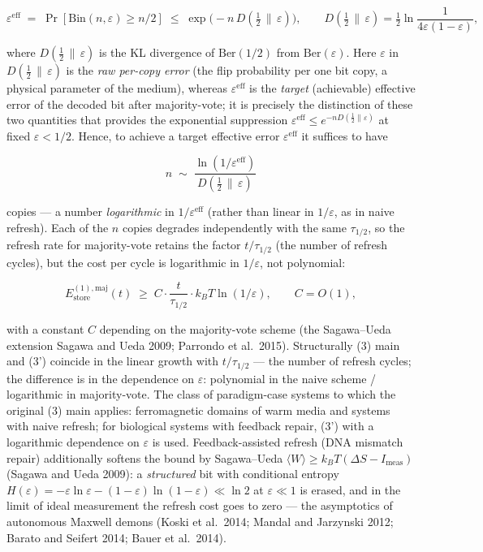 \documentclass[pdflatex,sn-mathphys-ay]{sn-jnl}
\begin{document}
\[\varepsilon^{\text{eff}} \;=\; \Pr\!\left[\mathrm{Bin}(n,\varepsilon) \ge n/2\right] \;\le\; \exp\!\bigl(-n\, D(\tfrac{1}{2}\,\|\,\varepsilon)\bigr), \qquad D(\tfrac{1}{2}\,\|\,\varepsilon) = \tfrac{1}{2}\ln\frac{1}{4\varepsilon(1-\varepsilon)},\]



where \(D(\tfrac{1}{2}\,\|\,\varepsilon)\) is the KL divergence of \(\mathrm{Ber}(1/2)\) from \(\mathrm{Ber}(\varepsilon)\). Here \(\varepsilon\) in \(D(\tfrac{1}{2}\,\|\,\varepsilon)\) is the \emph{raw per-copy error} (the flip probability per one bit copy, a physical parameter of the medium), whereas \(\varepsilon^{\text{eff}}\) is the \emph{target} (achievable) effective error of the decoded bit after majority-vote; it is precisely the distinction of these two quantities that provides the exponential suppression \(\varepsilon^{\text{eff}} \le e^{-n D(\frac{1}{2}\|\varepsilon)}\) at fixed \(\varepsilon < 1/2\). Hence, to achieve a target effective error \(\varepsilon^{\text{eff}}\) it suffices to have



\[n \;\sim\; \frac{\ln(1/\varepsilon^{\text{eff}})}{D(\tfrac{1}{2}\,\|\,\varepsilon)}\]



copies --- a number \emph{logarithmic} in \(1/\varepsilon^{\text{eff}}\) (rather than linear in \(1/\varepsilon\), as in naive refresh). Each of the \(n\) copies degrades independently with the same \(\tau_{1/2}\), so the refresh rate for majority-vote retains the factor \(t/\tau_{1/2}\) (the number of refresh cycles), but the cost per cycle is logarithmic in \(1/\varepsilon\), not polynomial:



\begin{equation}E_{\text{store}}^{(1),\text{maj}}(t) \;\ge\; C \cdot \frac{t}{\tau_{1/2}} \cdot k_B T \ln(1/\varepsilon), \qquad C = O(1), \tag{3'}\end{equation}



with a constant \(C\) depending on the majority-vote scheme (the Sagawa--Ueda extension Sagawa and Ueda 2009; Parrondo et al.~2015). Structurally (3) main and (3') coincide in the linear growth with \(t/\tau_{1/2}\) --- the number of refresh cycles; the difference is in the dependence on \(\varepsilon\): polynomial in the naive scheme / logarithmic in majority-vote. The class of paradigm-case systems to which the original (3) main applies: ferromagnetic domains of warm media and systems with naive refresh; for biological systems with feedback repair, (3') with a logarithmic dependence on \(\varepsilon\) is used. Feedback-assisted refresh (DNA mismatch repair) additionally softens the bound by Sagawa--Ueda \(\langle W \rangle \ge k_B T (\Delta S - I_{\text{meas}})\) (Sagawa and Ueda 2009): a \emph{structured} bit with conditional entropy \(H(\varepsilon) = -\varepsilon\ln\varepsilon - (1-\varepsilon)\ln(1-\varepsilon) \ll \ln 2\) at \(\varepsilon \ll 1\) is erased, and in the limit of ideal measurement the refresh cost goes to zero --- the asymptotics of autonomous Maxwell demons (Koski et al.~2014; Mandal and Jarzynski 2012; Barato and Seifert 2014; Bauer et al.~2014).
\end{document}
